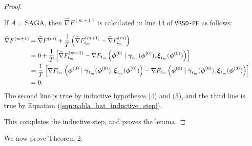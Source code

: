 \begin{proof}
\begin{enumerate}
        If $A = \text{SAGA}$, then $\widehat \nabla F^{(m+1)}$ is calculated in line 14 of \texttt{VRSO-PE} as follows:
        
        \begin{align*}
            \widehat \nabla F^{(m+1)} &= \widehat \nabla F^{(m)} + \frac{1}{T} \left(\widehat \nabla F^{(m+1)}_{t_m} - \widehat \nabla F^{(m)}_{t_m}\right) \\
            &= 0 + \frac{1}{T} \left[\widehat \nabla F^{(m+1)}_{t_m} - \nabla F_{t_m}\left(\boldsymbol{\phi}^{(0)} \mid \boldsymbol{\gamma}_{t_m}(\boldsymbol{\phi}^{(0)}), \boldsymbol{\xi}_{t_m}(\boldsymbol{\phi}^{(0)})\right)\right] \\
            &= \frac{1}{T} \left[\nabla F_{t_m}\left(\boldsymbol{\phi}^{(0)} \mid \boldsymbol{\gamma}_{t_m}(\boldsymbol{\phi}^{(0)}), \boldsymbol{\xi}_{t_m}(\boldsymbol{\phi}^{(0)})\right) - \nabla F_{t_m}\left(\boldsymbol{\phi}^{(0)} \mid \boldsymbol{\gamma}_{t_m}(\boldsymbol{\phi}^{(0)}), \boldsymbol{\xi}_{t_m}(\boldsymbol{\phi}^{(0)})\right)\right] \\
            &= 0.
        \end{align*}
        The second line is true by inductive hypotheses (4) and (5), and the third line is true by Equation (\ref{eqn:nabla_hat_inductive_step}).
    \end{enumerate}
    This completes the inductive step, and proves the lemma.
\end{proof}

We now prove Theorem 2.

